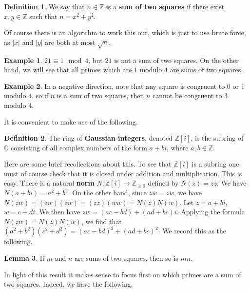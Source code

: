 \documentclass{article}
\newcommand{\Z}{\mathbb{Z}}
\newcommand{\C}{\mathbb{C}}
\newcommand{\rb}[1]{\left( #1 \right)}
\renewcommand{\sb}[1]{\left[ #1 \right]}
\newcommand{\abs}[1]{\left\lvert #1 \right\rvert}
\theoremstyle{definition}\newtheorem{definition}{Definition}
\theoremstyle{definition}\newtheorem{remark}[definition]{Remark}
\theoremstyle{definition}\newtheorem*{example}{Example}
\theoremstyle{definition}\newtheorem*{note}{Note}
\newtheorem{lemma}[definition]{Lemma}
\begin{document}
\begin{definition}
We say that $ n \in \Z $ is a \textbf{sum of two squares} if there exist $ x, y \in \Z $ such that $ n = x^2 + y^2 $.
\end{definition}

Of course there is an algorithm to work this out, which is just to use brute force, as $ \abs{x} $ and $ \abs{y} $ are both at most $ \sqrt{n} $.

\begin{example}
$ 21 \equiv 1 \mod 4 $, but $ 21 $ is not a sum of two squares. On the other hand, we will see that all primes which are $ 1 $ modulo $ 4 $ are sums of two squares.
\end{example}

\begin{example}
In a negative direction, note that any square is congruent to $ 0 $ or $ 1 $ modulo $ 4 $, so if $ n $ is a sum of two squares, then $ n $ cannot be congruent to $ 3 $ modulo $ 4 $.
\end{example}

It is convenient to make use of the following.

\begin{definition}
The ring of \textbf{Gaussian integers}, denoted $ \Z\sb{i} $, is the subring of $ \C $ consisting of all complex numbers of the form $ a + bi $, where $ a, b \in \Z $.
\end{definition}

Here are some brief recollections about this. To see that $ \Z\sb{i} $ is a subring one must of course check that it is closed under addition and multiplication. This is easy. There is a natural \textbf{norm} $ N : \Z\sb{i} \to \Z_{\ge 0} $ defined by $ N\rb{z} = z\bar{z} $. We have $ N\rb{a + bi} = a^2 + b^2 $. On the other hand, since $ \bar{z}\bar{w} = \bar{zw} $, we have $ N\rb{zw} = \rb{zw}\rb{\bar{zw}} = \rb{z\bar{z}}\rb{w\bar{w}} = N\rb{z}N\rb{w} $. Let $ z = a + bi $, $ w = c + di $. We then have $ zw = \rb{ac - bd} + \rb{ad + bc}i $. Applying the formula $ N\rb{zw} = N\rb{z}N\rb{w} $, we find that $ \rb{a^2 + b^2}\rb{c^2 + d^2} = \rb{ac - bd}^2 + \rb{ad + bc}^2 $. We record this as the following.

\begin{lemma}
\label{lem:46}
If $ m $ and $ n $ are sums of two squares, then so is $ mn $.
\end{lemma}

In light of this result it makes sense to focus first on which primes are a sum of two squares. Indeed, we have the following.
\end{document}
